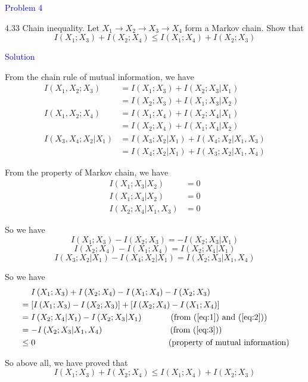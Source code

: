 \textcolor{blue}{Problem 4}

4.33 Chain inequality. Let $X_1 \rightarrow X_2 \rightarrow X_3 \rightarrow X_4$ form a Markov chain. Show that
    $$I\left(X_1 ; X_3\right)+I\left(X_2 ; X_4\right) \leq I\left(X_1 ; X_4\right)+I\left(X_2 ; X_3\right)$$

\textcolor{blue}{Solution}

From the chain rule of mutual information, we have
\begin{align*}
I\left(X_1,X_2;X_3\right) &= I\left(X_1;X_3\right) + I\left(X_2;X_3|X_1\right) \\
&= I\left(X_2;X_3\right) + I\left(X_1;X_3|X_2\right) \\
I\left(X_1,X_2;X_4\right) &= I\left(X_1;X_4\right) + I\left(X_2;X_4|X_1\right) \\
&= I\left(X_2;X_4\right) + I\left(X_1;X_4|X_2\right) \\
I\left(X_3,X_4;X_2|X_1\right) &= I\left(X_3;X_2|X_1\right) + I\left(X_4;X_2|X_1,X_3\right) \\
&= I\left(X_4;X_2|X_1\right) + I\left(X_3;X_2|X_1,X_4\right)
\end{align*}

From the property of Markov chain, we have
\begin{align*}
I\left(X_1;X_3|X_2\right) &= 0 \\
I\left(X_1;X_4|X_2\right) &= 0 \\
I\left(X_2;X_4|X_1,X_3\right) &= 0
\end{align*}

So we have
\begin{equation}
I\left(X_1;X_3\right) - I\left(X_2;X_3\right) = -I\left(X_2;X_3|X_1\right)
\label{eq:1}
\end{equation}
\begin{equation}
I\left(X_2;X_4\right) - I\left(X_1;X_4\right) = I\left(X_2;X_4|X_1\right)
\label{eq:2}
\end{equation}
\begin{equation}
I\left(X_3;X_2|X_1\right) - I\left(X_4;X_2|X_1\right) = I\left(X_2;X_3|X_1,X_4\right)
\label{eq:3}
\end{equation}

So we have
\begin{align*}
&\ \ \ \ I\left(X_1;X_3\right) + I\left(X_2;X_4\right) - I\left(X_1;X_4\right) - I\left(X_2;X_3\right) \\
&= \left[I\left(X_1;X_3\right) - I\left(X_2;X_3\right) \right] + \left[I\left(X_2;X_4\right) - I\left(X_1;X_4\right)\right] \\
&= I\left(X_2;X_4|X_1\right) - I\left(X_2;X_3|X_1\right) \text{\ \ \ \ \ \ \ \ \ \ (from (\ref{eq:1}) and (\ref{eq:2}))} \\
&= -I\left(X_2;X_3|X_1,X_4\right) \text{\ \ \ \ \ \ \ \ \ \ \ \ \ \ \ \ \ \ \ \ \ \ \ \ (from (\ref{eq:3}))} \\
&\leq 0 \text{\ \ \ \ \ \ \ \ \ \ \ \ \ \ \ \ \ \ \ \ \ \ \ \ \ \ \ \ \ \ \ \ \ \ \ \  \ \ \ \ \ \ \ \ \ \ \ \ (property of mutual information)}
\end{align*}

So above all, we have proved that
$$I\left(X_1 ; X_3\right)+I\left(X_2 ; X_4\right) \leq I\left(X_1 ; X_4\right)+I\left(X_2 ; X_3\right)$$

\newpage